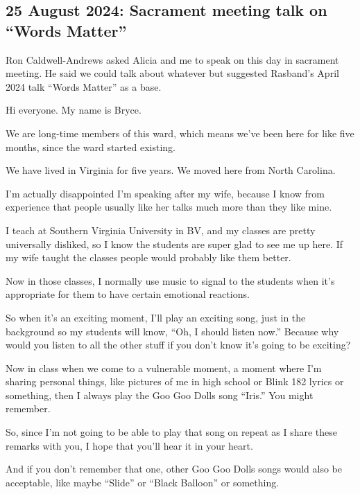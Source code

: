 	\subsection{25 August 2024: Sacrament meeting talk on ``Words Matter''}
		\label{TALKS-25-08-2024}
		
		Ron Caldwell-Andrews asked Alicia and me to speak on this day in sacrament meeting. He said we could talk about whatever but suggested Rasband's April 2024 talk ``Words Matter'' as a base.
		
		\begin{compactitem}
		
			\item Hi everyone. My name is Bryce.
				\begin{compactitem}
					\item We are long-time members of this ward, which means we've been here for like five months, since the ward started existing.
					\item We have lived in Virginia for five years. We moved here from North Carolina.
					\item I'm actually disappointed I'm speaking after my wife, because I know from experience that people usually like her talks much more than they like mine.
					\item I teach at Southern Virginia University in BV, and my classes are pretty universally disliked, so I know the students are super glad to see me up here. If my wife taught the classes people would probably like them better.
					\item Now in those classes, I normally use music to signal to the students when it's appropriate for them to have certain emotional reactions.
					\item So when it's an exciting moment, I'll play an exciting song, just in the background so my students will know, ``Oh, I should listen now.'' Because why would you listen to all the other stuff if you don't know it's going to be exciting?
					\item Now in class when we come to a vulnerable moment, a moment where I'm sharing personal things, like pictures of me in high school or Blink 182 lyrics or something, then I always play the Goo Goo Dolls song ``Iris.'' You might remember.
					\item So, since I'm not going to be able to play that song on repeat as I share these remarks with you, I hope that you'll hear it in your heart.
					\item And if you don't remember that one, other Goo Goo Dolls songs would also be acceptable, like maybe ``Slide'' or ``Black Balloon'' or something.
				\end{compactitem}
				

\end{compactitem}
